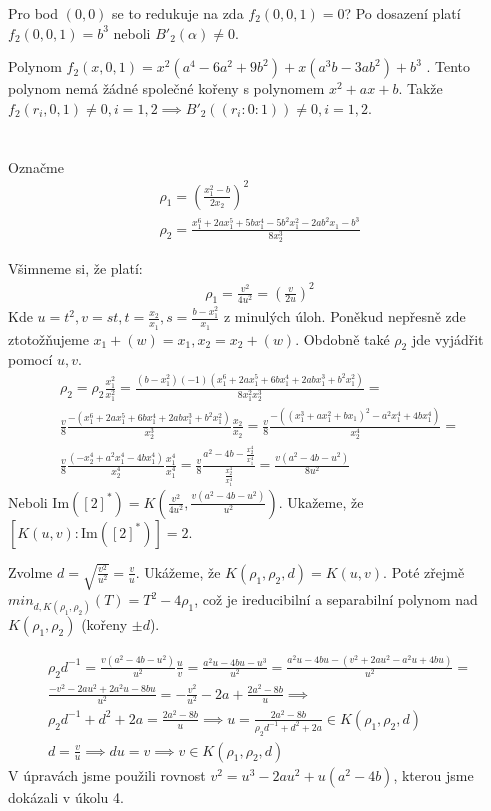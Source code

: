 \documentclass[12pt, a4paper]{article}
\begin{document}
Pro bod $(0,0)$ se to redukuje na zda $f_2(0,0,1) = 0$? Po dosazení platí $f_2(0,0,1) = b^3$ neboli $B'_2(\alpha) \neq 0$.

Polynom $f_2(x,0,1) = x^2(a^4-6a^2+9b^2)+x(a^3b-3ab^2)+b^3$ . Tento polynom nemá žádné společné kořeny s polynomem $x^2+ax+b$. Takže $f_2(r_i,0,1) \neq 0, i = 1,2 \implies B'_2((r_i:0:1)) \neq 0, i = 1,2$.

\section{}
Označme
\begin{gather*}
\rho_1 = \left( \frac{x_1^2-b}{2x_2} \right)^2\\
\rho_2 = \frac{x_1^6+2ax_1^5+5bx_1^4-5b^2x_1^2-2ab^2x_1-b^3}{8x_2^3}
\end{gather*}

Všimneme si, že platí:
\begin{gather*}
\rho_1 = \frac{v^2}{4u^2} = \left( \frac{v}{2u} \right)^2
\end{gather*}
Kde $u = t^2, v = st, t = \frac{x_2}{x_1}, s = \frac{b-x_1^2}{x_1}$ z minulých úloh. Poněkud nepřesně zde ztotožňujeme $x_1 + (w) = x_1, x_2= x_2 + (w)$. Obdobně také $\rho_2$ jde vyjádřit pomocí $u,v$. 
\begin{gather*}
\rho_2 = \rho_2  \frac{x_1^2}{x_1^2} = \frac{(b-x_1^2)(-1)(x_1^6+2ax_1^5+6bx_1^4+2abx_1^3+b^2x_1^2)}{8x_1^2x_2^3} = \\
\frac{v}{8} \frac{-(x_1^6+2ax_1^5+6bx_1^4+2abx_1^3+b^2x_1^2)}{x_2^3} \frac{x_2}{x_2} = \frac{v}{8} \frac{-((x_1^3+ax_1^2+bx_1)^2-a^2x_1^4+4bx_1^4)}{x_2^4} =\\
\frac{v}{8} \frac{(-x_2^4+a^2x_1^4-4bx_1^4)}{x_2^4} \frac{x_1^4}{x_1^4} = \frac{v}{8} \frac{a^2-4b-\frac{x_2^4}{x_1^4}}{\frac{x_2^4}{x_1^4}} = \frac{v(a^2-4b-u^2)}{8u^2}
\end{gather*}
Neboli $\text{Im}([2]^*) = K(\frac{v^2}{4u^2},\frac{v(a^2-4b-u^2)}{u^2})$. Ukažeme, že $[K(u,v):\text{Im}([2]^*)]=2$. 

Zvolme $d = \sqrt{\frac{v^2}{u^2}} = \frac{v}{u}$. Ukážeme, že $K(\rho_1,\rho_2,d)=K(u,v)$. Poté zřejmě $min_{d,K(\rho_1,\rho_2)}(T)=T^2-4\rho_1$, což je ireducibilní a separabilní polynom nad $K(\rho_1, \rho_2)$ (kořeny $\pm d$).

\begin{gather*}
\rho_2 d^{-1} = \frac{v(a^2-4b-u^2)}{u^2} \frac{u}{v} = \frac{a^2u-4bu-u^3}{u^2} = \frac{a^2u-4bu-(v^2+2au^2-a^2u+4bu)}{u^2} =\\
\frac{-v^2-2au^2+2a^2u-8bu}{u^2} = -\frac{v^2}{u^2} -2a + \frac{2a^2-8b}{u} \implies\\
\rho_2 d^{-1} + d^2 +2a = \frac{2a^2-8b}{u} \implies u = \frac{2a^2-8b}{\rho_2 d^{-1} + d^2 +2a} \in K(\rho_1, \rho_2, d)\\
d = \frac{v}{u} \implies d u = v \implies v \in K(\rho_1, \rho_2, d)
\end{gather*}
V úpravách jsme použili rovnost $v^2 = u^3-2au^2+u(a^2-4b)$, kterou jsme dokázali v úkolu 4.
\end{document}
